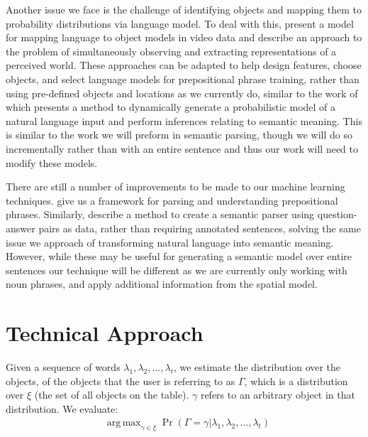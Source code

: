 \documentclass[conference]{IEEEtran}
\numberwithin{equation}{section}
\DeclareMathOperator*{\argmax}{arg\,max}
\begin{document}
Another issue we face is the challenge of identifying objects and mapping them to probability distributions via language model. To deal with this, \citet{barbu13} present a model for mapping language to object models in video data and \citet{UW_RSE_ICML2012} describe an approach to the problem of simultaneously observing and extracting representations of a perceived world. These approaches can be adapted to help design features, choose objects, and select language models for prepositional phrase training, rather than using pre-defined objects and locations as we currently do, similar to the work of \citet{tellex2011understanding} which presents a method to dynamically generate a probabilistic model of a natural language input and perform inferences relating to semantic meaning. This is similar to the work we will preform in semantic parsing, though we will do so incrementally rather than with an entire sentence and thus our work will need to modify these models.

There are still a number of improvements to be made to our machine learning techniques. \citet{rudzicz03} give us a framework for parsing and understanding prepositional phrases. Similarly, \citet{liang2013learning} describe a method to create a semantic parser using question-answer pairs as data, rather than requiring annotated sentences, solving the same issue we approach of transforming natural language into semantic meaning. However, while these may be useful for generating a semantic model over entire sentences our technique will be different as we are currently only working with noun phrases, and apply additional information from the spatial model. 


\section{Technical Approach}
\newcommand{\true}{\top}
\newcommand{\false}{\bot}
Given a sequence of words $\lambda_1, \lambda_2, \ldots, \lambda_t$, we estimate the distribution over the objects, of the objects that the user is referring to as $\Gamma$, which is a distribution over $\xi$ (the set of all objects on the table). $\gamma$ refers to an arbitrary object in that distribution. We evaluate:
\begin{align}
	& \argmax_{\gamma \in \xi} \Pr(\Gamma = \gamma | \lambda_1, \lambda_2, \ldots, \lambda_t) \
\end{align}
\end{document}
